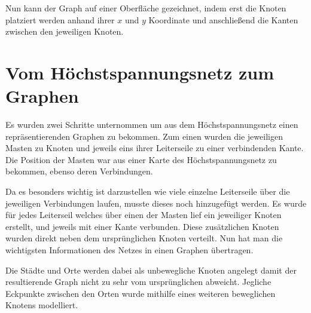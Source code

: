 Nun kann der Graph auf einer Oberfläche gezeichnet, indem erst die Knoten platziert werden anhand ihrer $x$ und $y$ Koordinate und anschließend die Kanten zwischen den jeweiligen Knoten. 


\section{Vom Höchstspannungsnetz zum Graphen}
\label{Vom Höchstspannungsnetz zum Graphen}
%

Es wurden zwei Schritte unternommen um aus dem Höchstspannungsnetz einen repräsentierenden Graphen zu bekommen. Zum einen wurden die jeweiligen Masten zu Knoten und jeweils eins ihrer Leiterseile zu einer verbindenden Kante. Die Position der Masten war aus einer Karte des Höchstspannungsnetz zu bekommen, ebenso deren Verbindungen. 

Da es besonders wichtig ist darzustellen wie viele einzelne Leiterseile über die jeweiligen Verbindungen laufen, musste dieses noch hinzugefügt werden. Es wurde für jedes Leiterseil welches über einen der Masten lief ein jeweiliger Knoten erstellt, und jeweils mit einer Kante verbunden. Diese zusätzlichen Knoten wurden direkt neben dem ursprünglichen Knoten verteilt. Nun hat man die wichtigsten Informationen des Netzes in einen Graphen übertragen.

Die Städte und Orte werden dabei als unbewegliche Knoten angelegt damit der resultierende Graph nicht zu sehr vom ursprünglichen abweicht. Jegliche Eckpunkte zwischen den Orten wurde mithilfe eines weiteren beweglichen Knotens modelliert.

